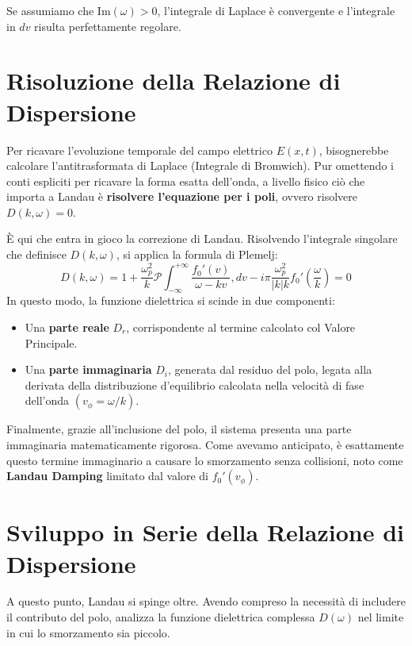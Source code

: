 Se assumiamo che $\text{Im}(\omega) > 0$, l'integrale di Laplace è convergente e l'integrale in $dv$ risulta perfettamente regolare.

\section{Risoluzione della Relazione di Dispersione}

Per ricavare l'evoluzione temporale del campo elettrico $E(x,t)$, bisognerebbe calcolare l'antitrasformata di Laplace (Integrale di Bromwich). Pur omettendo i conti espliciti per ricavare la forma esatta dell'onda, a livello fisico ciò che importa a Landau è \textbf{risolvere l'equazione per i poli}, ovvero risolvere $D(k,\omega) = 0$.

È qui che entra in gioco la correzione di Landau. Risolvendo l'integrale singolare che definisce $D(k,\omega)$, si applica la formula di Plemelj:
\begin{equation}
D(k,\omega) = 1 + \frac{\omega_p^2}{k} \mathcal{P} \int_{-\infty}^{+\infty} \frac{f_0'(v)}{\omega - kv} , dv - i\pi \frac{\omega_p^2}{|k| k} f_0'\left(\frac{\omega}{k}\right) = 0
\end{equation}
In questo modo, la funzione dielettrica si scinde in due componenti:
\begin{itemize}
\item Una \textbf{parte reale} $D_r$, corrispondente al termine calcolato col Valore Principale.
\item Una \textbf{parte immaginaria} $D_i$, generata dal residuo del polo, legata alla derivata della distribuzione d'equilibrio calcolata nella velocità di fase dell'onda $\left(v_\phi = \omega/k\right)$.
\end{itemize}

Finalmente, grazie all'inclusione del polo, il sistema presenta una parte immaginaria matematicamente rigorosa. Come avevamo anticipato, è esattamente questo termine immaginario a causare lo smorzamento senza collisioni, noto come \textbf{Landau Damping} limitato dal valore di $f_0'(v_\phi)$.

\section{Sviluppo in Serie della Relazione di Dispersione}

A questo punto, Landau si spinge oltre. Avendo compreso la necessità di includere il contributo del polo, analizza la funzione dielettrica complessa $D(\omega)$ nel limite in cui lo smorzamento sia piccolo.

